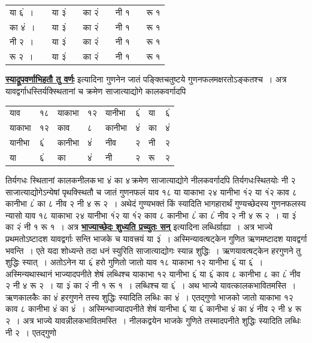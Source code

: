 \documentclass[11pt, openany]{book}
\begin{document}
\newpage 
\begin{table}[h!]
    \centering\s
    \begin{tabular}{lp{0.2cm}lp{0.2cm}lp{0.2cm}lp{0.2cm}l}
      या ६ं~।&& या ३ं&& का २ं&& नी १&& रू १ \\
का ४ं~।&& या ३ं& &का २ं&& नी १&& रू १ \\
नी २~।&& या ३ं& &का २ं&& नी १&& रू १ \\
रू २~।&& या ३ं&& का २ं&& नी १&& रू १ 
    \end{tabular}
\end{table}

 \hyperref[26]{\textbf{स्याद्रूपवर्णाभिहतौ तु वर्णः}} इत्यादिना गुणनेन जातं पङ्क्तिचतुष्टये
गुणनफलमक्षरतोऽङ्कतश्च~। अत्र यावद्वर्गाधस्तिर्यक्स्थितानां च क्रमेण
साजात्याद्योगे कालकवर्गादपि

\begin{table}[h!]
 \centering\s

\begin{tabular}{llllllll}
याव &१८ &याकाभा& १२& यानीभा &६ं& या& ६ं \\
याकाभा& १२& काव& ८ &कानीभा &४ं &का &४ं\\
यानीभा& ६ं& कानीभा& ४ं& नीव&२& नी& २ \\
या &६ं& का &४ं &नी& २& रू& २
\end{tabular}
\end{table}

\noindent तिर्यगधः स्थितानां कालकनीलक\textendash \,भा ४ं का ४\textendash \,क्रमेण साजात्याद्योगे
नीलकवर्गादपि तिर्यगधःस्थितयोः नी २ साजात्याद्योगेऽन्येषां पृथक्स्थितौ च
जातं गुणनफलं याव १८ या याकाभा २४ यानीभा १ं२ या १ं२ काव ८ कानीभा ८ं का ८ नीव २ नी ४ रू २~। अथेदं गुण्यभक्तं किं स्यादिति भागहारार्थं गुण्यच्छेदस्य गुणनफलस्य न्यासो याव १८ याकाभा २४ यानीभा १ं२ या १ं२ काव ८ कानीभा ८ं का ८ं नीव २ नी ४ रू २~। या ३ं का २ं नी १ रू १~। अत्र \hyperref[29]{\textbf{भाज्याच्छेदः शुध्यति प्रच्युतः सन्}} इत्यादिना लब्धिर्ग्राह्या~। अत्र भाज्ये प्रथमतोऽष्टादश
यावद्वर्गाः  सन्ति भाजके च यावत्त्रयं या ३ं~। अस्मिन्यावत्षट्केन गुणित ऋणमष्टादश
यावद्वर्गा भवन्ति~। एते यदा शोध्यन्ते तदा धनं स्युरिति साजात्याद्योगः
स्यान्न  शुद्धिः~। ऋणयावत्षट्केन हरगुणने तु शुद्धिः स्यात्~। अतोऽनेन या ६ं हरो 
गुणितो जातो याव १८ याकाभा १२ यानीभा ६ं या ६ं~। अस्मिन्यथास्थानं 
भाज्यादपनीते शेषं लब्धिश्च याकाभा १२ यानीभा ६ं या ६ं काव ८ कानीभा 
८ का ८ं नीव २ नी ४ रू २~। या ३ं का २ं नी १ रू १~। लब्धिश्च या 
६ं~। अथ भाज्ये यावत्कालकभावितमस्ति~। ऋणकालकैः का ४ं हरगुणने तस्य 
शुद्धिः स्यादिति लब्धिः का ४ं~। एतद्गुणो भाजको जातो याकाभा १२ काव ८ 
कानीभा ४ं का ४ं~। अस्मिन्भाज्यादपनीते शेषं यानीभा ६ं या ६ं कानीभा ४ं
का ४ं नीव २ नी ४ रू २~। अत्र भाज्ये यावन्नीलकभावितमस्ति~। 
नीलकद्वयेन भाजके गुणिते तस्मादपनीते शुद्धिः स्यादिति लब्धिः\textendash \,नी २~। एतद्गुणो
\afterpage{\fancyhead[LE,RO]{\thepage}}
\cfoot{}
\newpage
\end{document}
